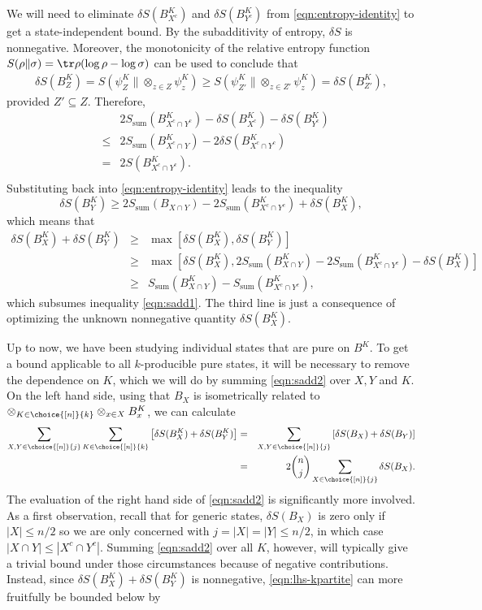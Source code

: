 \documentclass[12pt]{article}
\newcommand{\be}{\begin{equation}}
\newcommand{\ee}{\end{equation}}
\newcommand{\beq}{\begin{eqnarray}}
\newcommand{\eeq}{\end{eqnarray}}
\def\Sadd{{S_{\text{sum}}}}
\numberwithin{equation}{section}
\begin{document}
We will need to eliminate $\delta S(B_{X^c}^K)$ and $\delta S(B_{Y^c}^K)$ from \eqref{eqn:entropy-identity} to get a state-independent bound.
By the subadditivity of entropy, $\delta S$ is nonnegative. Moreover, the monotonicity of the relative entropy function $S(\rho \| \sigma) = \tr \rho (\log \rho - \log \sigma)$ can be used to conclude that
\beq
\delta S( B_Z^K )
= S( \psi^K_Z \| \otimes_{z \in Z} \psi_z^K )
\geq S( \psi^K_{Z'}  \| \otimes_{z \in Z'} \psi_z^K )
= \delta S( B_{Z'}^K ),
\eeq
provided $Z' \subseteq Z$. Therefore,
\beq
&\,& 2 \Sadd( B^K_{X^c \cap Y^c} ) - \delta S( B_{X^c}^K ) - \delta S( B_{Y^c}^K ) \\
&\leq& 2 \Sadd( B^K_{X^c \cap Y} ) - 2 \delta S( B_{X^c \cap Y^c}^K ) \\
&=& 2 S( B^K_{X^c \cap Y^c} ).  \\
\eeq
%
Substituting back into \eqref{eqn:entropy-identity} leads to the inequality
\be
\delta S(B_Y^K) \geq 2 \Sadd( B_{X \cap Y} ) - 2 \Sadd( B^K_{X^c \cap Y^c} ) + \delta S( B^K_X ),
\ee
which means that
\beq
\delta S(B_X^K) + \delta S(B_Y^K)
&\geq& \max \left[ \delta S(B_X^K), \delta S(B_Y^K) \right] \\
&\geq& \max \left[
	\delta S(B_X^K), 2 \Sadd( B_{X \cap Y}^K ) - 2 \Sadd( B^K_{X^c \cap Y^c} )
		- \delta S( B^K_X ) \right] \\
&\geq&  \Sadd( B_{X \cap Y}^K ) - \Sadd( B^K_{X^c \cap Y^c} ), \label{eqn:sadd2}
\eeq
which subsumes inequality \eqref{eqn:sadd1}. The third line is just a consequence of optimizing the unknown nonnegative quantity $\delta S( B_X^K )$.

Up to now, we have been studying individual states that are pure on $B^K$. To get a bound applicable to all $k$-producible pure states, it will be necessary to remove the dependence on $K$, which we will do by summing \eqref{eqn:sadd2} over $X, Y$ and $K$.
%
On the left hand side, using that $B_X$ is isometrically related to $\otimes_{K \in \choice{[n]}{k}} \otimes_{x \in X} B_x^K$, we can calculate
\beq
 \sum_{X,Y \in \choice{[n]}{j}} \sum_{K \in \choice{[n]}{k}}
	\left[ \delta S(B_X^K) + \delta S(B_Y^K) \right]
&=& \sum_{X,Y \in \choice{[n]}{j}} \left[ \delta S(B_X) + \delta S(B_Y) \right] \\
&=& 2 \binom{n}{j} \sum_{X \in \choice{[n]}{j}} \delta S(B_X). \label{eqn:lhs-kpartite}
\eeq
The evaluation of the right hand side of \eqref{eqn:sadd2} is significantly more involved. As a first observation, recall that for generic states, $\delta S(B_X)$ is zero only if $|X| \leq n/2$ so we are only concerned with $j = |X| = |Y| \leq n/2$, in which case $|X \cap Y| \leq |X^c \cap Y^c|$. Summing \eqref{eqn:sadd2} over all $K$, however, will typically give a trivial bound under those circumstances because of negative contributions. Instead, since $\delta S(B^K_X) + \delta S(B^K_Y)$ is nonnegative, \eqref{eqn:lhs-kpartite} can more fruitfully be bounded below by
\end{document}
